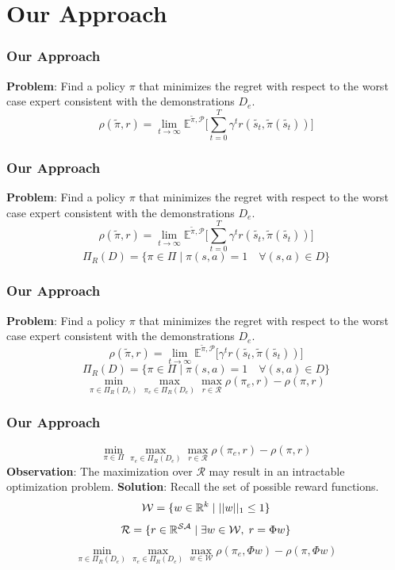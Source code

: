 \documentclass{beamer}
\begin{document}
\section*{Our Approach}

\begin{frame}
	\frametitle{Our Approach}
	\textbf{Problem}: Find a policy $\pi$ that minimizes the regret with respect to the worst case expert consistent with the demonstrations $D_e$.
	\[ \rho(\tilde{\pi}, r) = \lim_{t \to \infty} \mathbb{E}^{\tilde{\pi}, \mathcal{P}} \lbrack \sum_{t=0}^T \gamma^t r(\tilde{s_t}, \tilde{\pi}(\tilde{s_t})) \rbrack \]
\end{frame}

\begin{frame}
	\frametitle{Our Approach}
	\textbf{Problem}: Find a policy $\pi$ that minimizes the regret with respect to the worst case expert consistent with the demonstrations $D_e$.
	\[ \rho(\tilde{\pi}, r) = \lim_{t \to \infty} \mathbb{E}^{\tilde{\pi}, \mathcal{P}} \lbrack \sum_{t=0}^T \gamma^t r(\tilde{s_t}, \tilde{\pi}(\tilde{s_t})) \rbrack \]
	\[ \Pi_R(D) = \lbrace \pi \in \Pi \mid \pi(s,a) = 1 \quad \forall (s,a) \in D \rbrace \]
\end{frame}


\begin{frame}
	\frametitle{Our Approach}
	\textbf{Problem}: Find a policy $\pi$ that minimizes the regret with respect to the worst case expert consistent with the demonstrations $D_e$.
	\[ \rho(\tilde{\pi}, r) = \lim_{t \to \infty} \mathbb{E}^{\tilde{\pi}, \mathcal{P}} \lbrack \gamma^t r(\tilde{s_t}, \tilde{\pi}(\tilde{s_t})) \rbrack \]
	\[ \Pi_R(D) = \lbrace \pi \in \Pi \mid \pi(s,a) = 1 \quad \forall (s,a) \in D \rbrace \]
	\[ \min_{\pi \in \Pi_R(D_e)} \max_{\pi_e \in \Pi_R(D_e)} \max_{r \in \mathcal{R}} \rho(\pi_e, r) - \rho(\pi, r)\]
\end{frame}

\begin{frame}
	\frametitle{Our Approach}
	\[ \min_{\pi \in \Pi} \max_{\pi_e \in \Pi_R(D_e)} \max_{r \in \mathcal{R}} \rho(\pi_e, r) - \rho(\pi, r)\]
	\textbf{Observation}: The maximization over $\mathcal{R}$ may result in an intractable optimization problem.
	\textbf{Solution}: Recall the set of possible reward functions.
        \[ \mathcal{W} = \lbrace w \in \mathbb{R}^k \mid \lvert \lvert w \rvert \rvert_1 \leq 1 \rbrace \]
	\[ \mathcal{R} = \lbrace r \in \mathbb{R}^{\mathcal{S} \mathcal{A}} \mid \exists w \in \mathcal{W}, \; r = \Phi w \rbrace \]
	\[ \min_{\pi \in \Pi_R(D_e)} \max_{\pi_e \in \Pi_R(D_e)} \max_{w \in \mathcal{W}} \rho(\pi_e, \Phi w) - \rho(\pi, \Phi w)\]
\end{frame}
\end{document}
